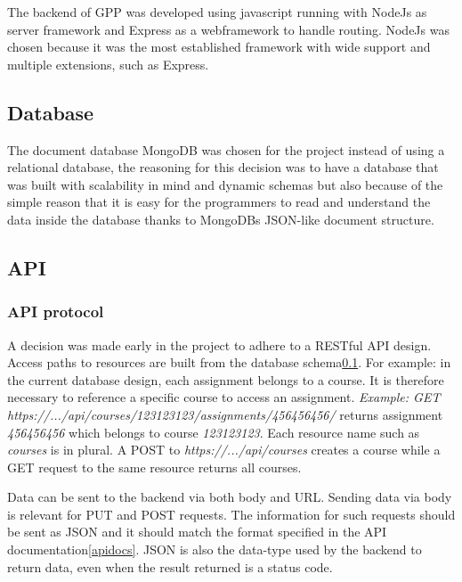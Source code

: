 
The backend of GPP was developed using javascript running with NodeJs as server framework and Express as a webframework to handle routing. NodeJs was chosen because it was the most established framework with wide support and multiple extensions, such as Express.

\subsection{Database} \label{database}

The document database MongoDB was chosen for the project instead of using a relational database, the reasoning for this decision was to have a database that was built with scalability in mind and dynamic schemas but also because of the simple reason that it is easy for the programmers to read and understand the data inside the database thanks to MongoDBs JSON-like document structure.

\subsection{API}
\subsubsection{API protocol}
A decision was made early in the project to adhere to a RESTful API design. Access paths to resources are built from the database schema\ref{database}. For example: in the current database design, each assignment belongs to a course. It is therefore necessary to reference a specific course to access an assignment. \emph{Example: GET https://.../api/courses/123123123/assignments/456456456/} returns assignment \emph{456456456} which belongs to course \emph{123123123}. Each resource name such as \emph{courses} is in plural. A POST to \emph{https://.../api/courses} creates a course while a GET request to the same resource returns all courses.

Data can be sent to the backend via both body and URL. Sending data via body is relevant for PUT and POST requests. The information for such requests should be sent as JSON and it should match the format specified in the API documentation\ref{apidocs}. JSON is also the data-type used by the backend to return data, even when the result returned is a status code.

